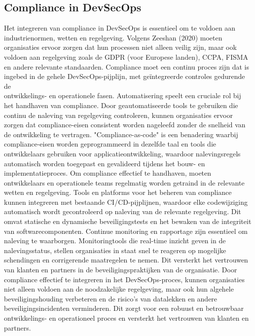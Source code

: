 \documentclass{hogent-article}
\begin{document}
   \subsection{Compliance in DevSecOps}
   
   Het integreren van compliance in DevSecOps is essentieel om te voldoen aan industrienormen, wetten en regelgeving. Volgens Zeeshan (2020) moeten organisaties ervoor zorgen dat hun processen niet alleen veilig zijn, maar ook voldoen aan regelgeving zoals de GDPR (voor Europese landen), CCPA, FISMA en andere relevante standaarden. Compliance moet een continu proces zijn dat is ingebed in de gehele DevSecOps-pijplijn, met geïntegreerde controles gedurende de\\ontwikkelings- en operationele fasen.
   Automatisering speelt een cruciale rol bij het handhaven van compliance. Door geautomatiseerde tools te gebruiken die continu de naleving van regelgeving controleren, kunnen organisaties ervoor zorgen dat compliance-eisen consistent worden nageleefd zonder de snelheid van de ontwikkeling te vertragen. "Compliance-as-code" is een benadering waarbij compliance-eisen worden geprogrammeerd in dezelfde taal en tools die ontwikkelaars gebruiken voor applicatieontwikkeling, waardoor nalevingsregels automatisch worden toegepast en gevalideerd tijdens het bouw- en implementatieproces.
   Om compliance effectief te handhaven, moeten ontwikkelaars en operationele teams regelmatig worden getraind in de relevante wetten en regelgeving. Tools en platforms voor het beheren van compliance kunnen integreren met bestaande CI/CD-pijplijnen, waardoor elke codewijziging automatisch wordt gecontroleerd op naleving van de relevante regelgeving. Dit omvat statische en dynamische beveiligingstests en het bewaken van de integriteit van softwarecomponenten.
   Continue monitoring en rapportage zijn essentieel om naleving te waarborgen. Monitoringtools die real-time inzicht geven in de nalevingsstatus, stellen organisaties in staat snel te reageren op mogelijke schendingen en corrigerende maatregelen te nemen. Dit versterkt het vertrouwen van klanten en partners in de beveiligingspraktijken van de organisatie.
   Door compliance effectief te integreren in het DevSecOps-proces, kunnen organisaties niet alleen voldoen aan de noodzakelijke regelgeving, maar ook hun algehele beveiligingshouding verbeteren en de risico's van datalekken en andere beveiligingsincidenten verminderen. Dit zorgt voor een robuust en betrouwbaar ontwikkelings- en operationeel proces en versterkt het vertrouwen van klanten en partners.\autocite{Zeeshan2020}\\
   
\end{document}
